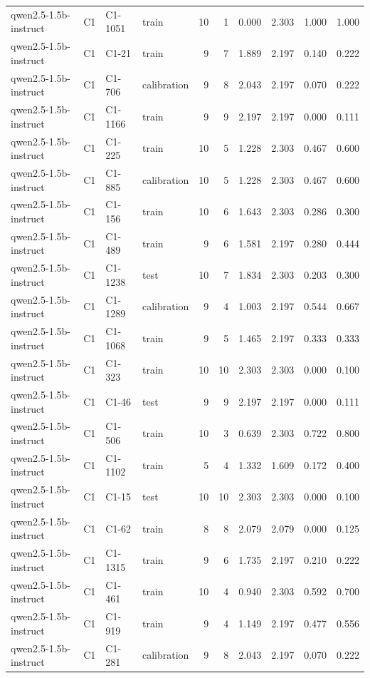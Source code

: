 \begin{table}
\begin{tabular}{llllrrrrrr}
qwen2.5-1.5b-instruct & C1 & C1-1051 & train & 10 & 1 & 0.000 & 2.303 & 1.000 & 1.000 \\
qwen2.5-1.5b-instruct & C1 & C1-21 & train & 9 & 7 & 1.889 & 2.197 & 0.140 & 0.222 \\
qwen2.5-1.5b-instruct & C1 & C1-706 & calibration & 9 & 8 & 2.043 & 2.197 & 0.070 & 0.222 \\
qwen2.5-1.5b-instruct & C1 & C1-1166 & train & 9 & 9 & 2.197 & 2.197 & 0.000 & 0.111 \\
qwen2.5-1.5b-instruct & C1 & C1-225 & train & 10 & 5 & 1.228 & 2.303 & 0.467 & 0.600 \\
qwen2.5-1.5b-instruct & C1 & C1-885 & calibration & 10 & 5 & 1.228 & 2.303 & 0.467 & 0.600 \\
qwen2.5-1.5b-instruct & C1 & C1-156 & train & 10 & 6 & 1.643 & 2.303 & 0.286 & 0.300 \\
qwen2.5-1.5b-instruct & C1 & C1-489 & train & 9 & 6 & 1.581 & 2.197 & 0.280 & 0.444 \\
qwen2.5-1.5b-instruct & C1 & C1-1238 & test & 10 & 7 & 1.834 & 2.303 & 0.203 & 0.300 \\
qwen2.5-1.5b-instruct & C1 & C1-1289 & calibration & 9 & 4 & 1.003 & 2.197 & 0.544 & 0.667 \\
qwen2.5-1.5b-instruct & C1 & C1-1068 & train & 9 & 5 & 1.465 & 2.197 & 0.333 & 0.333 \\
qwen2.5-1.5b-instruct & C1 & C1-323 & train & 10 & 10 & 2.303 & 2.303 & 0.000 & 0.100 \\
qwen2.5-1.5b-instruct & C1 & C1-46 & test & 9 & 9 & 2.197 & 2.197 & 0.000 & 0.111 \\
qwen2.5-1.5b-instruct & C1 & C1-506 & train & 10 & 3 & 0.639 & 2.303 & 0.722 & 0.800 \\
qwen2.5-1.5b-instruct & C1 & C1-1102 & train & 5 & 4 & 1.332 & 1.609 & 0.172 & 0.400 \\
qwen2.5-1.5b-instruct & C1 & C1-15 & test & 10 & 10 & 2.303 & 2.303 & 0.000 & 0.100 \\
qwen2.5-1.5b-instruct & C1 & C1-62 & train & 8 & 8 & 2.079 & 2.079 & 0.000 & 0.125 \\
qwen2.5-1.5b-instruct & C1 & C1-1315 & train & 9 & 6 & 1.735 & 2.197 & 0.210 & 0.222 \\
qwen2.5-1.5b-instruct & C1 & C1-461 & train & 10 & 4 & 0.940 & 2.303 & 0.592 & 0.700 \\
qwen2.5-1.5b-instruct & C1 & C1-919 & train & 9 & 4 & 1.149 & 2.197 & 0.477 & 0.556 \\
qwen2.5-1.5b-instruct & C1 & C1-281 & calibration & 9 & 8 & 2.043 & 2.197 & 0.070 & 0.222 \\

\end{tabular}
\end{table}
